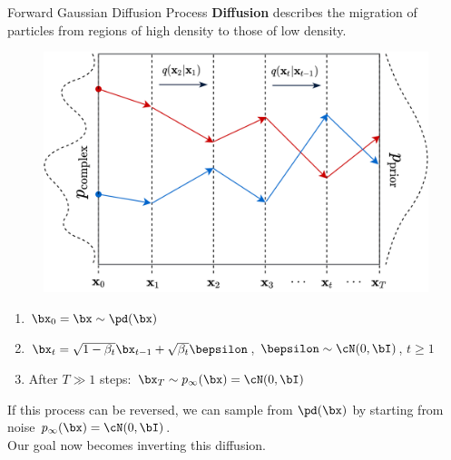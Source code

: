 \documentclass{beamer}
\begin{document}
\begin{frame}{Forward Gaussian Diffusion Process}
	\textbf{Diffusion} describes the migration of particles from regions of high density to those of low density.
	\vspace{-0.2cm}
	\begin{figure}
		\includegraphics[width=0.5\linewidth]{figs/diffusion_over_time}
	\end{figure}
    \eqpause
	\vspace{-0.5cm}
	\begin{enumerate}
		\item $\bx_0 = \bx \sim \pd(\bx)$
		\item $\bx_t = \sqrt{1 - \beta_t} \bx_{t-1} + \sqrt{\beta_t} \bepsilon$, $\bepsilon \sim \cN(0, \bI)$, $t \geq 1$
		\item After $T \gg 1$ steps: $\bx_T \sim p_\infty(\bx) = \cN(0, \bI)$
	\end{enumerate}
    \eqpause
	If this process can be reversed, we can sample from $\pd(\bx)$ by starting from noise $p_\infty(\bx) = \cN(0, \bI)$. \\
	Our goal now becomes inverting this diffusion.
\end{frame}
\end{document}
